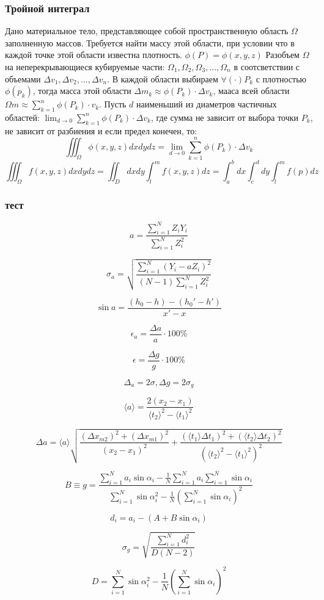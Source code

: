 \subsubsection{Тройной интеграл}
\begin{definition}
    Дано материальное тело, представляющее собой пространственную область $\Omega$ заполненную массов. Требуется найти массу этой области, при условии что в каждой точке этой области известна плотность. $\phi(P) = \phi(x,y,z)$
    Разобъем $\Omega$ на неперекрывающиеся кубируемые части: $\Omega_1, \Omega_2, \Omega_3, ... , \Omega_n$ в соотсветствии с объемами $\Delta v_1, \Delta v_2, ... , \Delta v_n$. В каждой области выбираем $\forall (\cdot) P_k $ с плотностью $\phi(p_k)$, тогда масса этой области $\Delta m_k \approx \phi(P_k) \cdot \Delta v_k$, мааса всей области $\Omega m \approx \sum_{k=1}^{n} \phi(P_k) \cdot v_k$. Пусть $d$ наименьший из диаметров частичных областей: $\lim_{d\rightarrow 0} \sum_{k=1}^{n} \phi(P_k) \cdot \Delta v_k$, где сумма не зависит от выбора точки $P_k$, не зависит от разбиения и если предел конечен, то:
    $$
        \iiint_{\Omega} \phi(x,y,z) dxdydz = \lim_{d \rightarrow 0} \sum_{k=1}^n \phi(P_k) \cdot \Delta v_k
    $$
    $$
        \iiint_\Omega f(x,y,z) dxdydz = \iint_D dxdy \int_l^m f(x,y,z ) dz = \int_a^b dx \int^d_c dy \int^m_l f(p) dz 
    $$
\end{definition}



\subsubsection{тест}

$$
a = \frac{\sum_{i=1}^N Z_iY_i}{\sum_{i=1}^N Z_i^2}
$$

$$
\sigma_a = \sqrt{\frac{\sum_{i=1}^N (Y_i - aZ_i)^2}{(N-1)\sum_{i=1}^N Z^2_i}}
$$

$$
\sin a = \frac{(h_0 - h) - (h_0' - h')}{x'-x}
$$

$$
\epsilon_a = \frac{\Delta a}{a} \cdot 100\%
$$

$$
\epsilon = \frac{\Delta g}{g} \cdot 100\%
$$

$$
\Delta_a = 2\sigma, \Delta g = 2\sigma_g
$$

$$
\langle a \rangle = \frac{2(x_2 - x_1)}{\langle t_2 \rangle^2 - \langle t_1 \rangle^2}
$$

$$
\Delta a = \langle a \rangle \sqrt{\frac{(\Delta x_{m2})^2 + (\Delta x_{m1})^2}{(x_2 - x_1)^2} + \frac{(\langle t_1\rangle \Delta t_1)^2 + (\langle t_2\rangle \Delta t_2)^2}{(\langle t_2\rangle ^2 - \langle t_1\rangle ^2)^2}}
$$

$$
B \equiv g = \frac{
    \sum_{i=1}^N a_i \sin \alpha_i - \frac{1}{N} \sum_{i=1}^N a_i \sum_{i=1}^N \sin \alpha_i
}{
    \sum_{i=1}^N \sin \alpha_i^2 - \frac{1}{N}(\sum_{i=1}^N \sin \alpha_i)^2
}
$$

$$
d_i = a_i - (A+B \sin \alpha_i)
$$

$$
\sigma_g = \sqrt{\frac{
    \sum_{i=1}^N d^2_i
}{
    D(N-2)
}}
$$

$$
    D = \sum_{i=1}^N \sin \alpha_i^2 - \frac{1}{N}(\sum_{i=1}^N \sin \alpha_i)^2
$$